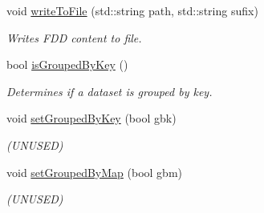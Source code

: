 \begin{DoxyCompactItemize}
void \hyperlink{classfaster_1_1iFddCore_a6058211f45b0f603ff6e2ffab1976148}{write\+To\+File} (std\+::string path, std\+::string sufix)
\begin{DoxyCompactList}\small\item\em Writes F\+DD content to file. \end{DoxyCompactList}\item 
bool \hyperlink{classfaster_1_1iFddCore_a85b2607d1cc8f604a3965c313f16b240}{is\+Grouped\+By\+Key} ()
\begin{DoxyCompactList}\small\item\em Determines if a dataset is grouped by key. \end{DoxyCompactList}\item 
\hypertarget{classfaster_1_1iFddCore_a37c6f71cc6ce171ccd78120c7103f181}{}\label{classfaster_1_1iFddCore_a37c6f71cc6ce171ccd78120c7103f181} 
void \hyperlink{classfaster_1_1iFddCore_a37c6f71cc6ce171ccd78120c7103f181}{set\+Grouped\+By\+Key} (bool gbk)
\begin{DoxyCompactList}\small\item\em (U\+N\+U\+S\+ED) \end{DoxyCompactList}\item 
\hypertarget{classfaster_1_1iFddCore_a54fc3721d1e6291b9e741c7d5e2b7573}{}\label{classfaster_1_1iFddCore_a54fc3721d1e6291b9e741c7d5e2b7573} 
void \hyperlink{classfaster_1_1iFddCore_a54fc3721d1e6291b9e741c7d5e2b7573}{set\+Grouped\+By\+Map} (bool gbm)
\begin{DoxyCompactList}\small\item\em (U\+N\+U\+S\+ED) \end{DoxyCompactList}\end{DoxyCompactItemize}
